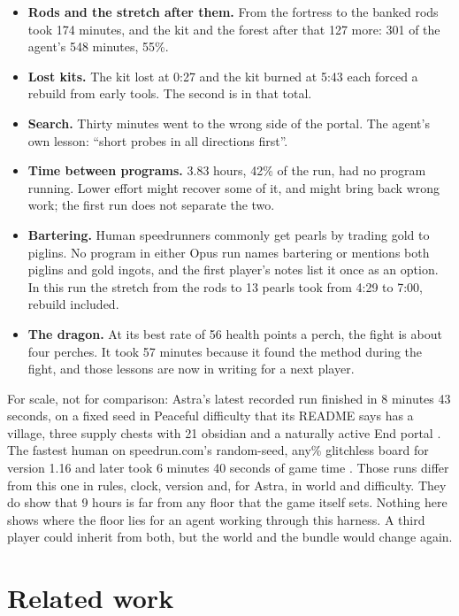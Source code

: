 \documentclass[11pt,a4paper]{article}
\begin{document}
\begin{itemize}
  \item \textbf{Rods and the stretch after them.} From the fortress to the banked rods took 174 minutes, and the kit and the forest after that 127 more: 301 of the agent's 548 minutes, 55\%.
  \item \textbf{Lost kits.} The kit lost at 0:27 and the kit burned at 5:43 each forced a rebuild from early tools. The second is in that total.
  \item \textbf{Search.} Thirty minutes went to the wrong side of the portal. The agent's own lesson: ``short probes in all directions first''.
  \item \textbf{Time between programs.} 3.83 hours, 42\% of the run, had no program running. Lower effort might recover some of it, and might bring back wrong work; the first run does not separate the two.
  \item \textbf{Bartering.} Human speedrunners commonly get pearls by trading gold to piglins. No program in either Opus run names bartering or mentions both piglins and gold ingots, and the first player's notes list it once as an option. In this run the stretch from the rods to 13 pearls took from 4:29 to 7:00, rebuild included.
  \item \textbf{The dragon.} At its best rate of 56 health points a perch, the fight is about four perches. It took 57 minutes because it found the method during the fight, and those lessons are now in writing for a next player.
\end{itemize}

\noindent For scale, not for comparison: Astra's latest recorded run finished in 8 minutes 43 seconds, on a fixed seed in Peaceful difficulty that its README says has a village, three supply chests with 21 obsidian and a naturally active End portal \citep{malde2026astra}. The fastest human on speedrun.com's random-seed, any\% glitchless board for version 1.16 and later took 6 minutes 40 seconds of game time \citep{speedrun2026}. Those runs differ from this one in rules, clock, version and, for Astra, in world and difficulty. They do show that 9 hours is far from any floor that the game itself sets. Nothing here shows where the floor lies for an agent working through this harness. A third player could inherit from both, but the world and the bundle would change again.

\section{Related work}
\end{document}
